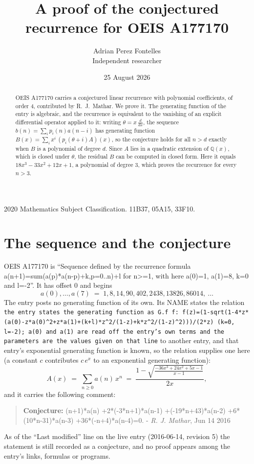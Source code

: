 \documentclass[11pt,a4paper]{article}
\title{A proof of the conjectured recurrence for OEIS A177170}
\author{Adrian Perez Fontelles\\ \small Independent researcher}
\date{25 August 2026}
\theoremstyle{plain}
\theoremstyle{definition}
\begin{document}
\maketitle

\begin{abstract}
OEIS A177170 carries a conjectured linear recurrence with polynomial coefficients, of
order 4, contributed by R.~J.~Mathar. We prove it. The generating function of the
entry is algebraic, and the recurrence is equivalent to the vanishing of an explicit
differential operator applied to it: writing $\theta=x\,\frac{d}{dx}$, the sequence
$b(n)=\sum_{i}p_{i}(n)a(n-i)$ has generating function
$B(x)=\sum_{i}x^{i}\,(p_{i}(\theta+i)A)(x)$, so the conjecture holds for all $n>d$ exactly
when $B$ is a polynomial of degree $d$. Since $A$ lies in a quadratic extension of
$\mathbb{Q}(x)$, which is closed under $\theta$, the residual $B$ can be computed in
closed form. Here it equals $18 x^{3} - 33 x^{2} + 12 x + 1$, a polynomial of degree $3$, which proves
the recurrence for every $n>3$.
\end{abstract}

\noindent\small 2020 Mathematics Subject Classification. 11B37, 05A15, 33F10.\normalsize

\section{The sequence and the conjecture}

OEIS A177170 is ``Sequence defined by the recurrence formula a(n+1)=sum(a(p)*a(n-p)+k,p=0..n)+l for n>=1, with here a(0)=1, a(1)=8, k=0 and l=-2''. It has offset $0$ and begins
\[
a(0),\dots,a(7)\;=\;1, 8, 14, 90, 402, 2438, 13826, 86014,\ \dots
\]
The entry posts no generating function of its own. Its NAME states the
relation \texttt{the entry states the generating function as G.f f: f(z)=(1-sqrt(1-4*z*(a(0)-z*a(0)\textasciicircum{}2+z*a(1)+(k+l)*z\textasciicircum{}2/(1-z)+k*z\textasciicircum{}2/(1-z)\textasciicircum{}2)))/(2*z) (k=0, l=-2); a(0) and a(1) are read off the entry's own terms and the parameters are the values given on that line} to another entry, and that entry's exponential generating
function is known, so the relation supplies one here (a constant $c$ contributes
$c\,e^{x}$ to an exponential generating function):
\begin{equation}\label{eq:gf}
A(x)\;=\;\sum_{n\ge 0} a(n)\,x^{n}\;=\;\frac{1 - \sqrt{\frac{- 36 x^{3} + 24 x^{2} + 5 x - 1}{x - 1}}}{2 x} ,
\end{equation}
and it carries the following comment:
\begin{quote}\small
\textbf{Conjecture:} (n+1)*a(n) +2*(-3*n+1)*a(n-1) +(-19*n+43)*a(n-2) +6*(10*n-31)*a(n-3) +36*(-n+4)*a(n-4)=0. - \emph{R. J. Mathar}, Jun 14 2016
\end{quote}
As of the ``Last modified'' line on the live entry (2016-06-14, revision 5) the
statement is still recorded as a conjecture, and no proof appears among the entry's links,
formulas or programs.
\end{document}
